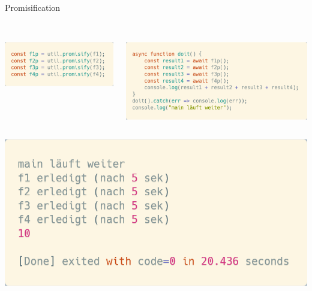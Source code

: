 \documentclass[t,handout]{beamer}
\begin{document}
\begin{frame}{Promisification}
  \begin{columns}
    \begin{column}{0.30\textwidth}\\
      \includegraphics[scale=.21]{fig/promify1.png}
    \end{column}
    \begin{column}{0.5\textwidth}\\
      \includegraphics[scale=.21]{fig/promify2.png}
    \end{column}
  \end{columns}
  \begin{center}
    \includegraphics[scale=.24]{fig/promify3.png}
  \end{center}
\end{frame}
\end{document}
